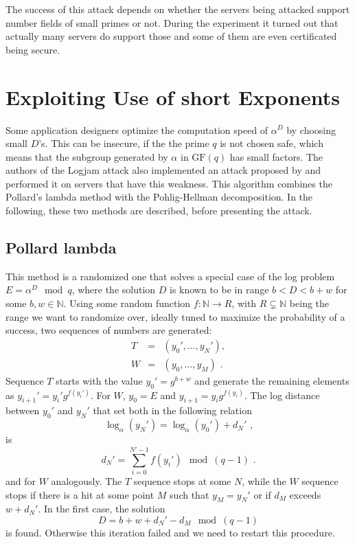\documentclass[paper=a4, fontsize=11pt]{scrartcl} %
\numberwithin{equation}{section} %
\numberwithin{figure}{section} %
\numberwithin{table}{section} %
\begin{document}
The success of this attack depends on whether the servers being attacked support number fields of small primes or not. During the experiment it turned out that actually many servers do support those and some of them are even certificated being secure.

\section{Exploiting Use of short Exponents}
Some application designers optimize the computation speed of $\alpha^D$ by choosing small $D$'s. This can be insecure, if the the prime $q$ is not chosen safe, which means that the subgroup generated by $\alpha$ in $\mathrm{GF}(q)$ has small factors. The authors of the Logjam attack also implemented an attack proposed by \citep{van1996diffie} and performed it on servers that have this weakness. This algorithm combines the Pollard's lambda method with the Pohlig-Hellman decomposition. In the following, these two methods are described, before presenting the attack.

\subsection{Pollard lambda} This method is a randomized one that solves a special case of the log problem $E = \alpha^D\mod q$, where the solution $D$ is known to be in range $b<D<b+w$ for some $b,w\in \mathbb{N}$. Using some random function $f:\mathbb{N}\rightarrow R$, with $R\subsetneq\mathbb{N}$ being the range we want to randomize over, ideally tuned to maximize the probability of a success, two sequences of numbers are generated:
\begin{equation}
\begin{array}{lcl}
T & = & (y_0',...,y_N'),\\
W & = & (y_0,...,y_M)
\text{ .}
\end{array}
\end{equation}
Sequence $T$ starts with the value $y_0' = g^{b+w}$ and generate the remaining elements as $y_{i+1}' = y_i'g^{f(y_i')}$. For $W$, $y_0 = E$ and $y_{i+1} = y_ig^{f(y_i)}$. The log distance between $y_0'$ and $y_N'$ that set both in the following relation
\begin{equation}
\log_\alpha(y_N') = \log_\alpha(y_0') + d_N'
\text{ ,}
\end{equation}
is
\begin{equation}
d_N' = \sum_{i=0}^{N'-1}f(y_i')\mod (q-1)
\text{ .}
\end{equation}
and for $W$ analogously. The $T$ sequence stops at some $N$, while the $W$ sequence stops if there is a hit at some point $M$ such that $y_M = y_N'$ or if $d_M$ exceeds $w+d_N'$. In the first case, the solution
\begin{equation}
D = b + w + d_N' - d_M \mod (q-1)
\end{equation}
is found. Otherwise this iteration failed and we need to restart this procedure.
\end{document}
